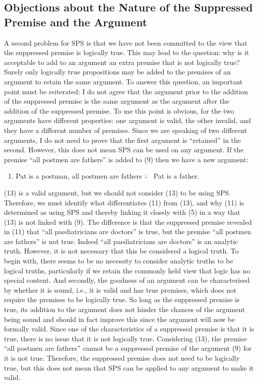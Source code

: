 \subsection*{Objections about the Nature of the Suppressed Premise and the
Argument}

A second problem for SPS is that we have not been committed to the view
that the suppressed premise is logically true. This may lead to the
question: why is it acceptable to add to an argument an extra premise
that is not logically true? Surely only logically true propositions may
be added to the premises of an argument to retain the same argument. To
answer this question, an important point must be reiterated: I do not
agree that the argument prior to the addition of the suppressed premise
is the same argument as the argument after the addition of the
suppressed premise. To me this point is obvious, for the two arguments
have different properties: one argument is valid, the other invalid, and
they have a different number of premises. Since we are speaking of two
different arguments, I do not need to prove that the first argument is
``retained'' in the second. However, this does not mean SPS can be used
on any argument. If the premise ``all postmen are fathers'' is added to
(9) then we have a new argument:

\begin{enumerate}[leftmargin=42pt] 
\def\labelenumi{(\arabic{enumi})}
\setcounter{enumi}{12}
\item
  Pat is a postman, all postmen are fathers $\therefore$ \ Pat is a father.
\end{enumerate}

\noindent (13) is a valid argument, but we should not consider (13) to be using SPS. Therefore, we must identify what differentiates (11) from (13), and
why (11) is determined as using SPS and thereby linking it closely with
(5) in a way that (13) is not linked with (9). The difference is that
the suppressed premise revealed in (11) that ``all paediatricians are
doctors'' is true, but the premise ``all postmen are fathers'' is not
true. Indeed ``all paediatricians are doctors'' is an analytic truth.
However, it is not necessary that this be considered a logical truth. To
begin with, there seems to be no necessity to consider analytic truths
to be logical truths, particularly if we retain the commonly held view
that logic has no special content. And secondly, the goodness of an
argument can be characterised by whether it is sound, i.e., it is valid
and has true premises, which does not require the premises to be
logically true. So long as the suppressed premise is true, its addition
to the argument does not hinder the chances of the argument being sound
and should in fact improve this since the argument will now be formally
valid. Since one of the characteristics of a suppressed premise is that
it is true, there is no issue that it is not logically true. Considering
(13), the premise ``all postmen are fathers'' cannot be a suppressed
premise of the argument (9) for it is not true. Therefore, the
suppressed premise does not need to be logically true, but this does not
mean that SPS can be applied to any argument to make it valid.

